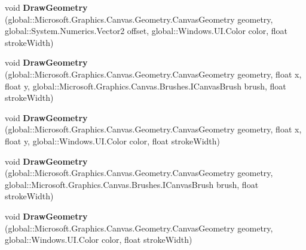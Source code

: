 \begin{DoxyCompactItemize}
\mbox{\label{class_microsoft_1_1_graphics_1_1_canvas_1_1_canvas_drawing_session_af1df685cb1900e0ed10ebd2bde5e4fa5}} 
void {\bfseries Draw\+Geometry} (global\+::\+Microsoft.\+Graphics.\+Canvas.\+Geometry.\+Canvas\+Geometry geometry, global\+::\+System.\+Numerics.\+Vector2 offset, global\+::\+Windows.\+U\+I.\+Color color, float stroke\+Width)
\item 
\mbox{\label{class_microsoft_1_1_graphics_1_1_canvas_1_1_canvas_drawing_session_a713656e57a0727d2d1dab9fb1b0f17ec}} 
void {\bfseries Draw\+Geometry} (global\+::\+Microsoft.\+Graphics.\+Canvas.\+Geometry.\+Canvas\+Geometry geometry, float x, float y, global\+::\+Microsoft.\+Graphics.\+Canvas.\+Brushes.\+I\+Canvas\+Brush brush, float stroke\+Width)
\item 
\mbox{\label{class_microsoft_1_1_graphics_1_1_canvas_1_1_canvas_drawing_session_a7e7853ba7de2d027dc3f6d10937c1a2f}} 
void {\bfseries Draw\+Geometry} (global\+::\+Microsoft.\+Graphics.\+Canvas.\+Geometry.\+Canvas\+Geometry geometry, float x, float y, global\+::\+Windows.\+U\+I.\+Color color, float stroke\+Width)
\item 
\mbox{\label{class_microsoft_1_1_graphics_1_1_canvas_1_1_canvas_drawing_session_aec6beeaf3963df362041af465297d038}} 
void {\bfseries Draw\+Geometry} (global\+::\+Microsoft.\+Graphics.\+Canvas.\+Geometry.\+Canvas\+Geometry geometry, global\+::\+Microsoft.\+Graphics.\+Canvas.\+Brushes.\+I\+Canvas\+Brush brush, float stroke\+Width)
\item 
\mbox{\label{class_microsoft_1_1_graphics_1_1_canvas_1_1_canvas_drawing_session_a5c4ce0d7be91e58ff8dc914880e231e8}} 
void {\bfseries Draw\+Geometry} (global\+::\+Microsoft.\+Graphics.\+Canvas.\+Geometry.\+Canvas\+Geometry geometry, global\+::\+Windows.\+U\+I.\+Color color, float stroke\+Width)
\item 
\mbox{\label{class_microsoft_1_1_graphics_1_1_canvas_1_1_canvas_drawing_session_afd10ed3cd35716eec33d455787db693d}} 

\end{DoxyCompactItemize}

